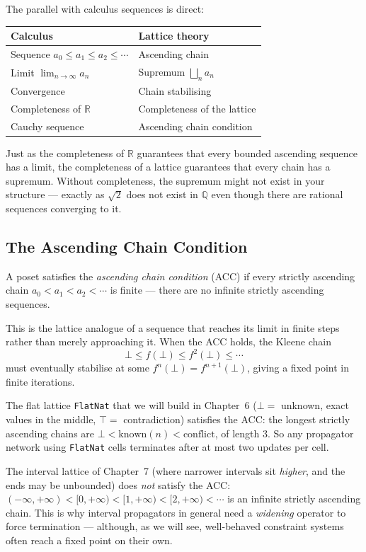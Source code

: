 \documentclass[12pt, a4paper, openright]{book}
\theoremstyle{thmstyle}
\theoremstyle{defstyle}
\newcommand{\lc}[1]{\texttt{#1}}
\newenvironment{exbox}[1][]{%
  \begin{tcolorbox}[exbox, title={Example\ifx\\#1\\\else\ --- #1\fi}]%
}{\end{tcolorbox}}
\begin{document}
The parallel with calculus sequences is direct:

\begin{center}
\begin{tabular}{ll}
  \textbf{Calculus} & \textbf{Lattice theory} \\
  \hline
  Sequence $a_0 \leq a_1 \leq a_2 \leq \cdots$ & Ascending chain \\
  Limit $\lim_{n\to\infty} a_n$ & Supremum $\bigsqcup_n a_n$ \\
  Convergence & Chain stabilising \\
  Completeness of $\mathbb{R}$ & Completeness of the lattice \\
  Cauchy sequence & Ascending chain condition \\
\end{tabular}
\end{center}

Just as the completeness of $\mathbb{R}$ guarantees that every bounded ascending
sequence has a limit, the completeness of a lattice guarantees that every chain
has a supremum. Without completeness, the supremum might not exist in your
structure --- exactly as $\sqrt{2}$ does not exist in $\mathbb{Q}$ even though
there are rational sequences converging to it.

\subsection*{The Ascending Chain Condition}

A poset satisfies the \emph{ascending chain condition} (ACC) if every strictly
ascending chain $a_0 < a_1 < a_2 < \cdots$ is finite --- there are no infinite
strictly ascending sequences.

This is the lattice analogue of a sequence that reaches its limit in finite steps
rather than merely approaching it. When the ACC holds, the Kleene chain
$$\bot \leq f(\bot) \leq f^2(\bot) \leq \cdots$$
must eventually stabilise at some $f^n(\bot) = f^{n+1}(\bot)$, giving a fixed
point in finite iterations.

\begin{exbox}[ACC in practice]
  The flat lattice \lc{FlatNat} that we will build in Chapter~6
  ($\bot = $ unknown, exact values in the middle, $\top = $ contradiction)
  satisfies the ACC: the longest strictly ascending chains are
  $\bot < \mathrm{known}(n) < \mathrm{conflict}$, of length 3. So any
  propagator network using \lc{FlatNat} cells terminates after at most two
  updates per cell.

  The interval lattice of Chapter~7 (where narrower intervals sit
  \emph{higher}, and the ends may be unbounded) does \emph{not} satisfy the
  ACC: $(-\infty,+\infty) < [0,+\infty) < [1,+\infty) < [2,+\infty) < \cdots$
  is an infinite strictly ascending chain. This is why interval propagators
  in general need a \emph{widening} operator to force termination ---
  although, as we will see, well-behaved constraint systems often reach a
  fixed point on their own.
\end{exbox}
\end{document}

